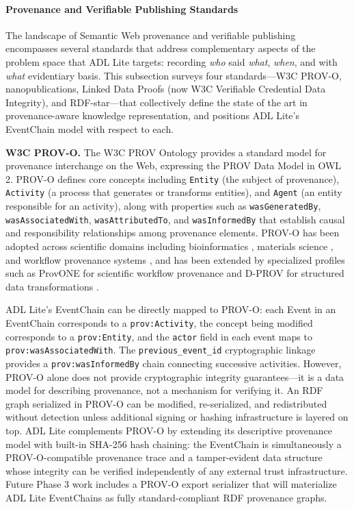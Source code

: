 \paragraph{Provenance and Verifiable Publishing Standards}\label{provenance-and-verifiable-publishing-standards}

The landscape of Semantic Web provenance and verifiable publishing encompasses several standards that address complementary aspects of the problem space that ADL Lite targets: recording \emph{who} said \emph{what}, \emph{when}, and with \emph{what} evidentiary basis. This subsection surveys four standards---W3C PROV-O, nanopublications, Linked Data Proofs (now W3C Verifiable Credential Data Integrity), and RDF-star---that collectively define the state of the art in provenance-aware knowledge representation, and positions ADL Lite's EventChain model with respect to each.

\textbf{W3C PROV-O.} The W3C PROV Ontology \cite{ref34} provides a standard model for provenance interchange on the Web, expressing the PROV Data Model \cite{ref35} in OWL 2. PROV-O defines core concepts including \texttt{Entity} (the subject of provenance), \texttt{Activity} (a process that generates or transforms entities), and \texttt{Agent} (an entity responsible for an activity), along with properties such as \texttt{wasGeneratedBy}, \texttt{wasAssociatedWith}, \texttt{wasAttributedTo}, and \texttt{wasInformedBy} that establish causal and responsibility relationships among provenance elements. PROV-O has been adopted across scientific domains including bioinformatics \cite{ref36}, materials science \cite{ref37}, and workflow provenance systems \cite{ref38}, and has been extended by specialized profiles such as ProvONE for scientific workflow provenance \cite{ref38} and D-PROV for structured data transformations \cite{ref39}.

ADL Lite's EventChain can be directly mapped to PROV-O: each Event in an EventChain corresponds to a \texttt{prov:Activity}, the concept being modified corresponds to a \texttt{prov:Entity}, and the \texttt{actor} field in each event maps to \texttt{prov:wasAssociatedWith}. The \texttt{previous\_event\_id} cryptographic linkage provides a \texttt{prov:wasInformedBy} chain connecting successive activities. However, PROV-O alone does not provide cryptographic integrity guarantees---it is a data model for describing provenance, not a mechanism for verifying it. An RDF graph serialized in PROV-O can be modified, re-serialized, and redistributed without detection unless additional signing or hashing infrastructure is layered on top. ADL Lite complements PROV-O by extending its descriptive provenance model with built-in SHA-256 hash chaining: the EventChain is simultaneously a PROV-O-compatible provenance trace and a tamper-evident data structure whose integrity can be verified independently of any external trust infrastructure. Future Phase 3 work includes a PROV-O export serializer that will materialize ADL Lite EventChains as fully standard-compliant RDF provenance graphs.

